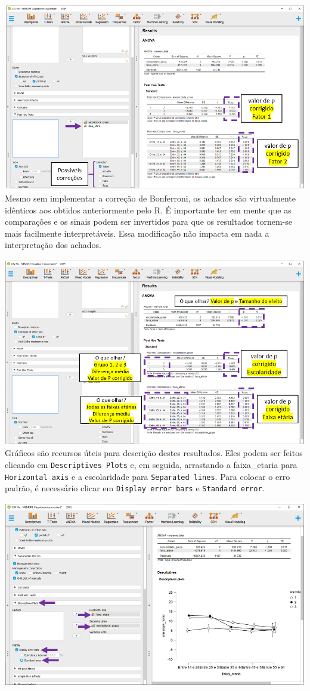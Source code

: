 \documentclass[
]{book}
\begin{document}
\includegraphics{./img/cap_anova_two_way_posthoc2.png}
Mesmo sem implementar a correção de Bonferroni, os achados são virtualmente idênticos aos obtidos anteriormente pelo R. É importante ter em mente que as comparações e os sinais podem ser invertidos para que os resultados tornem-se mais facilmente interpretáveis. Essa modificação não impacta em nada a interpretação dos achados.

\includegraphics{./img/cap_anova_two_way_posthoc_interpretacao.png}
Gráficos são recursos úteis para descrição destes resultados. Eles podem ser feitos clicando em \texttt{Descriptives\ Plots} e, em seguida, arrastando a faixa\_etaria para \texttt{Horizontal\ axis} e a escolaridade para \texttt{Separated\ lines}. Para colocar o erro padrão, é necessário clicar em \texttt{Display\ error\ bars} e \texttt{Standard\ error}.

\includegraphics{./img/cap_anova_two_way_descriptives_final.png}
\end{document}
